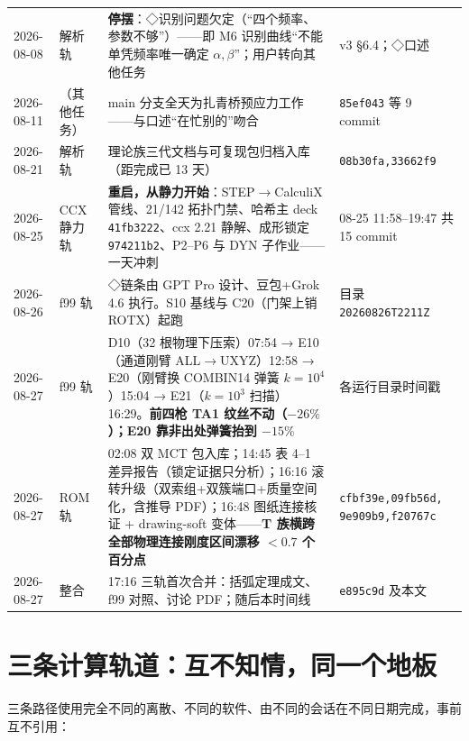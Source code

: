 \documentclass[11pt,a4paper]{ctexart}
\begin{document}
\begin{longtable}{@{}p{2.1cm}p{2.2cm}p{7.2cm}p{3.4cm}@{}}
2026-08-08 & 解析轨 & \textbf{停摆}：◇识别问题欠定（``四个频率、参数不够''）——即 M6 识别曲线``不能单凭频率唯一确定 $\alpha,\beta$''；用户转向其他任务 & v3 §6.4；◇口述 \\
2026-08-11 & （其他任务） & main 分支全天为扎青桥预应力工作——与口述``在忙别的''吻合 & \texttt{85ef043} 等 9 commit \\
2026-08-21 & 解析轨 & 理论族三代文档与可复现包归档入库（距完成已 13 天） & \texttt{08b30fa,33662f9} \\
2026-08-25 & CCX 静力轨 & \textbf{重启，从静力开始}：STEP$\to$CalculiX 管线、21/142 拓扑门禁、哈希主 deck \texttt{41fb3222}、ccx 2.21 静解、成形锁定 \texttt{974211b2}、P2--P6 与 DYN 子作业——一天冲刺 & 08-25 11:58--19:47 共 15 commit \\
2026-08-26 & f99 轨 & ◇链条由 GPT Pro 设计、豆包+Grok 4.6 执行。S10 基线与 C20（门架上销 ROTX）起跑 & 目录 \texttt{20260826T2211Z} \\
2026-08-27 & f99 轨 & D10（32 根物理下压索）07:54 → E10（通道刚臂 ALL$\to$UXYZ）12:58 → E20（刚臂换 COMBIN14 弹簧 $k{=}10^4$）15:04 → E21（$k{=}10^3$ 扫描）16:29。\textbf{前四枪 TA1 纹丝不动（$-26\%$）；E20 靠非出处弹簧抬到 $-15\%$} & 各运行目录时间戳 \\
2026-08-27 & ROM 轨 & 02:08 双 MCT 包入库；14:45 表 4--1 差异报告（锁定证据只分析）；16:16 滚转升级（双索组+双簇端口+质量空间化，含推导 PDF）；16:48 图纸连接核证 + drawing-soft 变体——\textbf{T 族横跨全部物理连接刚度区间漂移 $<0.7$ 个百分点} & \texttt{cfbf39e,09fb56d, 9e909b9,f20767c} \\
2026-08-27 & 整合 & 17:16 三轨首次合并：括弧定理成文、f99 对照、讨论 PDF；随后本时间线 & \texttt{e895c9d} 及本文 \\
\bottomrule
\end{longtable}

\section{三条计算轨道：互不知情，同一个地板}

三条路径使用完全不同的离散、不同的软件、由不同的会话在不同日期完成，事前互不引用：
\end{document}
